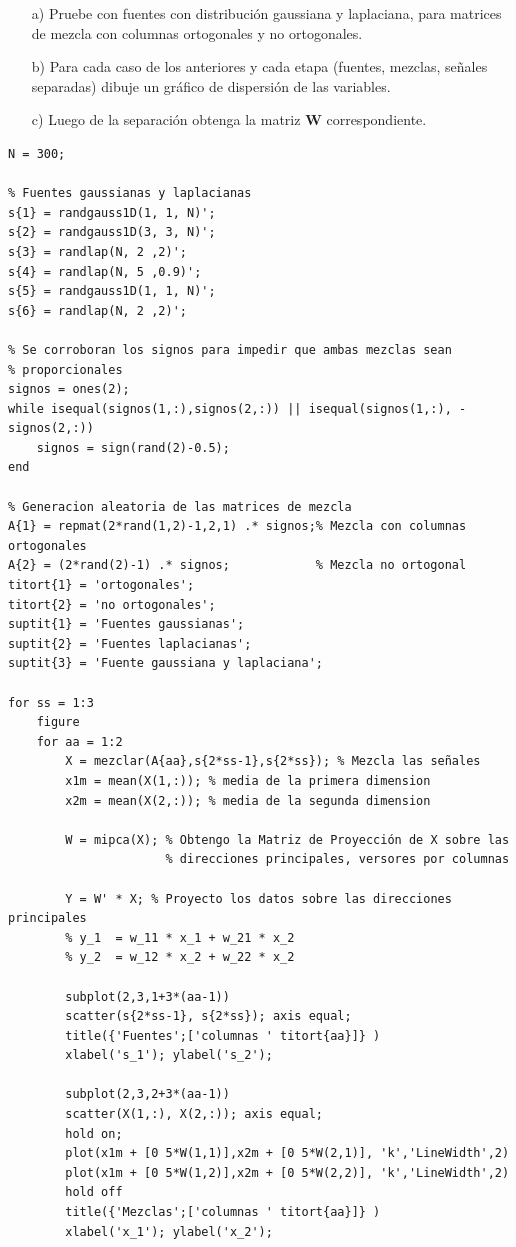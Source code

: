 \documentclass[11pt,a4paper,final]{article}
\begin{document}
\begin{enumerate}
   \item[a)] Pruebe con fuentes con distribución gaussiana y laplaciana, para matrices de mezcla con columnas ortogonales y no ortogonales.
   \item[b)] Para cada caso de los anteriores y cada etapa (fuentes, mezclas, señales separadas) dibuje un gráfico de dispersión de las variables.
   \item[c)] Luego de la separación obtenga la matriz $\mathbf{W}$ correspondiente.
\end{enumerate}
\begin{verbatim}
N = 300;

% Fuentes gaussianas y laplacianas
s{1} = randgauss1D(1, 1, N)';
s{2} = randgauss1D(3, 3, N)';
s{3} = randlap(N, 2 ,2)';
s{4} = randlap(N, 5 ,0.9)';
s{5} = randgauss1D(1, 1, N)';
s{6} = randlap(N, 2 ,2)';

% Se corroboran los signos para impedir que ambas mezclas sean
% proporcionales
signos = ones(2);
while isequal(signos(1,:),signos(2,:)) || isequal(signos(1,:), -signos(2,:))
    signos = sign(rand(2)-0.5);
end

% Generacion aleatoria de las matrices de mezcla
A{1} = repmat(2*rand(1,2)-1,2,1) .* signos;% Mezcla con columnas ortogonales
A{2} = (2*rand(2)-1) .* signos;            % Mezcla no ortogonal
titort{1} = 'ortogonales';
titort{2} = 'no ortogonales';
suptit{1} = 'Fuentes gaussianas';
suptit{2} = 'Fuentes laplacianas';
suptit{3} = 'Fuente gaussiana y laplaciana';

for ss = 1:3
    figure
    for aa = 1:2
        X = mezclar(A{aa},s{2*ss-1},s{2*ss}); % Mezcla las señales
        x1m = mean(X(1,:)); % media de la primera dimension
        x2m = mean(X(2,:)); % media de la segunda dimension

        W = mipca(X); % Obtengo la Matriz de Proyección de X sobre las
                      % direcciones principales, versores por columnas

        Y = W' * X; % Proyecto los datos sobre las direcciones principales
        % y_1  = w_11 * x_1 + w_21 * x_2
        % y_2  = w_12 * x_2 + w_22 * x_2

        subplot(2,3,1+3*(aa-1))
        scatter(s{2*ss-1}, s{2*ss}); axis equal;
        title({'Fuentes';['columnas ' titort{aa}]} )
        xlabel('s_1'); ylabel('s_2');

        subplot(2,3,2+3*(aa-1))
        scatter(X(1,:), X(2,:)); axis equal;
        hold on;
        plot(x1m + [0 5*W(1,1)],x2m + [0 5*W(2,1)], 'k','LineWidth',2)
        plot(x1m + [0 5*W(1,2)],x2m + [0 5*W(2,2)], 'k','LineWidth',2)
        hold off
        title({'Mezclas';['columnas ' titort{aa}]} )
        xlabel('x_1'); ylabel('x_2');


\end{verbatim}
\end{document}
